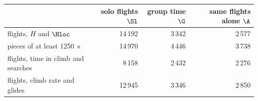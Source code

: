 \begin{tabular}{@{}l r r r@{}}
\toprule
 & solo flights $\Sl$ & group time $\G$ & same flights alone $\A$ \\
\midrule
flights, $H$ and $\Hloc$ & 14\,192 & 3\,342 & 2\,577 \\
pieces of at least 1250~s & 14\,970 & 4\,446 & 3\,738 \\
flights, time in climb and searches & 8\,158 & 2\,432 & 2\,276 \\
flights, climb rate and glides & 12\,945 & 3\,346 & 2\,850 \\
\bottomrule
\end{tabular}
